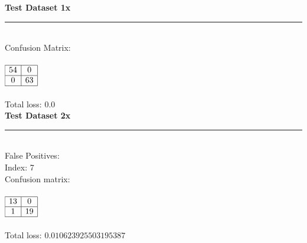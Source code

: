 \begin{enumerate}
\begin{enumerate}
				\bf{Test Dataset 1x} \\
				\noindent\rule{8cm}{0.4pt} \\
				\textnormal{Confusion Matrix:} \\ \\
				\(
					\begin{array}{|c|c|}
						\hline
							54 & 0 \\
							\hline
							0 & 63 \\
						\hline
					\end{array}
				\) \\ \\
				\textnormal{Total loss: 0.0} \\
				
				\bf{Test Dataset 2x} \\
				\noindent\rule{8cm}{0.4pt} \\
				\textnormal{False Positives:} \\
				\textnormal{Index: 7 }\\
				\textnormal{ Confusion matrix: } \\ \\
				\(
					\begin{array}{|c|c|}
						\hline
							13 & 0 \\
							\hline
							1 & 19 \\
						\hline
					\end{array}
				\) \\ \\
				\textnormal{Total loss:} \(0.010623925503195387\) \\
				

\end{enumerate}
\end{enumerate}
